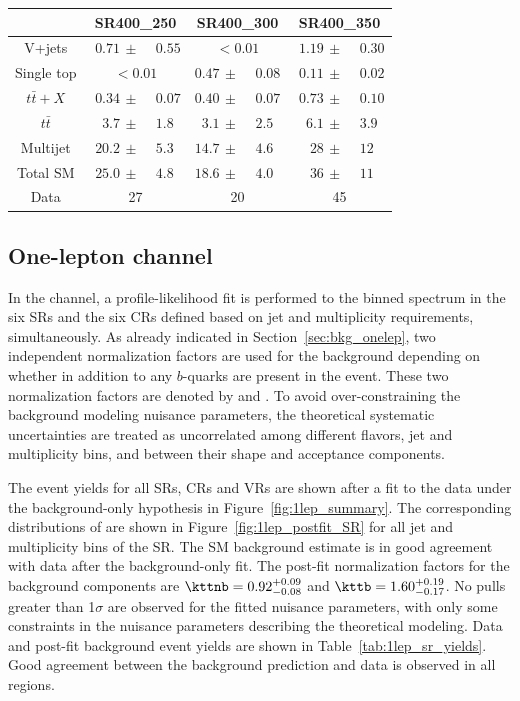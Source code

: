 \begin{table}[htb]
\begin{tabular}{c|r@{}lr@{}lr@{}l}
        & \multicolumn{2}{c}{SR400\_250} & \multicolumn{2}{c}{SR400\_300} & \multicolumn{2}{c}{SR400\_350} \\ 
      \toprule
      V+jets & $\,\,0.71\,\pm\,$ & $0.55$ & \multicolumn{2}{c}{$<0.01$}  & $\,\,1.19\,\pm\,$ & $0.30$ \\ 
      Single top & \multicolumn{2}{c}{$<0.01$}  & $0.47\,\pm\,$ & $0.08$ & $0.11\,\pm\,$ & $0.02$ \\ 
      $t\bar{t}+X$ & $0.34\,\pm\,$ & $0.07$ & $0.40\,\pm\,$ & $0.07$ & $0.73\,\pm\,$ & $0.10$ \\ 
      $t\bar{t}$ & $3.7\,\pm\,$ & $1.8$ & $3.1\,\pm\,$ & $2.5$ & $6.1\,\pm\,$ & $3.9$ \\ 
      Multijet & $20.2\,\pm\,$ & $5.3$ & $14.7\,\pm\,$ & $4.6$ & $28\,\pm\,$ & $12$ \\ 
      \midrule
      Total SM & $25.0\,\pm\,$ & $4.8$ & $18.6\,\pm\,$ & $4.0$ & $36\,\pm\,$ & $11$ \\ 
      \midrule
      Data & \multicolumn{2}{c}{27} & \multicolumn{2}{c}{20} & \multicolumn{2}{c}{45} \\ 
      \bottomrule
    \end{tabular}
\end{table}

\subsection{One-lepton channel}
\label{sec:fit_onelep}
In the \onelep channel, a profile-likelihood fit is performed to the binned \dave spectrum in the six SRs and the six CRs defined based on jet and \bjet multiplicity requirements, simultaneously.
As already indicated in Section~\ref{sec:bkg_onelep}, two independent normalization factors are used for the \ttbar background depending on whether in addition to \ttbar any $b$-quarks are present in the event. These two normalization factors are denoted by \kttb and \kttnb. 
To avoid over-constraining the background modeling nuisance parameters, the theoretical systematic uncertainties are treated as uncorrelated among different \ttbar flavors, jet and \bjet multiplicity bins, and between their shape and acceptance components.

The event yields for all SRs, CRs and VRs are shown after a fit to the data under the background-only hypothesis in Figure~\ref{fig:1lep_summary}. 
The corresponding distributions of \dave are shown in Figure~\ref{fig:1lep_postfit_SR} for all jet and \bjet multiplicity bins of the SR. The SM background estimate is in good agreement with data after the background-only fit. The post-fit normalization factors for the \ttbar background components are $\kttnb=0.92^{+0.09}_{-0.08}$ and $\kttb=1.60^{+0.19}_{-0.17}$. No pulls greater than 1$\sigma$ are observed for the fitted nuisance parameters, with only some constraints in the nuisance parameters describing the theoretical modeling. Data and post-fit background event yields are shown in Table~\ref{tab:1lep_sr_yields}. Good agreement between the background prediction and data is observed in all regions. %

